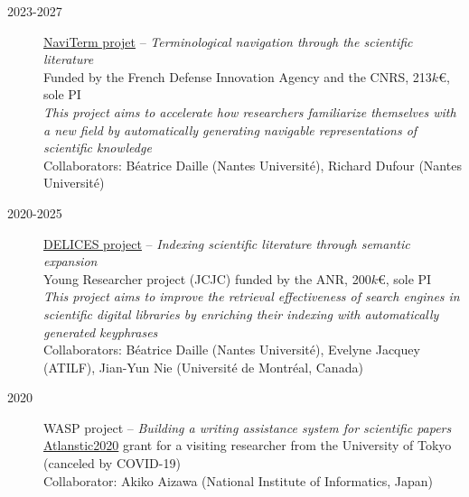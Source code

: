 \begin{description}

    \item[2023-2027] \href{https://cnrs-naviterm.github.io/}{NaviTerm projet} --
                    \emph{Terminological navigation through the scientific literature} \\
                    Funded by the French Defense Innovation Agency and the CNRS, 213$k$€, sole PI \\[.1em]
                    \emph{This project aims to accelerate how researchers familiarize themselves with a new field by automatically generating navigable representations of scientific knowledge}\\[.1em]
                    Collaborators: Béatrice Daille (Nantes Université), Richard Dufour (Nantes Université)

    \item[2020-2025] \href{https://anr-delices.github.io/}{DELICES project} --
                    \emph{Indexing scientific literature through semantic expansion} \\
                    Young Researcher project (JCJC) funded by the ANR, 200$k$€, sole PI \\[.1em]
                    \emph{This project aims to improve the retrieval effectiveness of search engines in scientific digital libraries by enriching their indexing with automatically generated keyphrases}\\[.1em]
                    Collaborators: Béatrice Daille (Nantes Université), Evelyne Jacquey (ATILF), Jian-Yun Nie (Université de Montréal, Canada)

    \item[2020] WASP project --
                \emph{Building a writing assistance system for scientific papers} \\
                 \href{https://Atlanstic2020.fr/}{Atlanstic2020} grant for a visiting researcher from the University of Tokyo (canceled by COVID-19) \\
                 Collaborator: Akiko Aizawa (National Institute of Informatics, Japan)
                 

\end{description}
